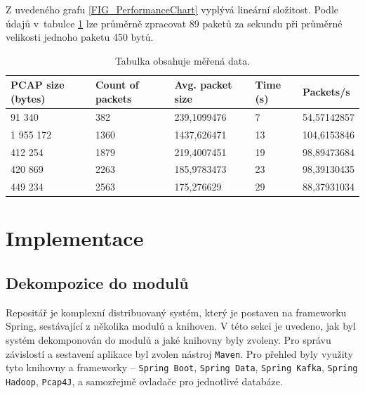 \vspace{0.5cm}

\noindent Z uvedeného grafu \ref{FIG_PerformanceChart} vyplývá lineární složitost. Podle údajů v~tabulce \ref{TablePerformance} lze průměrně zpracovat 89 paketů za sekundu při průměrné velikosti jednoho paketu 450 bytů.



\vspace{0.5cm}

\begin{table}[h!]
    \centering
    \begin{tabular}{| l | l | l | l | l |}
    \hline
    PCAP size (bytes)   &   Count of packets   &   Avg. packet size &  Time (s) &   Packets/s \\ \hline
    91 340 & 382 & 239,1099476 & 7 & 54,57142857 \\ \hline
    1 955 172 & 1360 & 1437,626471 & 13 & 104,6153846 \\ \hline
    412 254 & 1879 & 219,4007451 & 19 & 98,89473684 \\ \hline
    420 869 & 2263 & 185,9783473 & 23 & 98,39130435 \\ \hline
    449 234 & 2563 & 175,276629 & 29 & 88,37931034 \\ \hline
    \end{tabular}\par
    \bigskip
    \caption{Tabulka obsahuje měřená data.}
    \label{TablePerformance}
\end{table}

\chapter{Implementace} \label{chapter_impl}

\section{Dekompozice do modulů}
Repositář je komplexní distribuovaný systém, který je postaven na frameworku Spring, sestávající z několika modulů a knihoven. V této sekci je uvedeno, jak byl systém dekomponován do modulů a jaké knihovny byly zvoleny. Pro správu závislostí a sestavení aplikace byl zvolen nástroj \texttt{Maven}. Pro přehled byly využity tyto knihovny a frameworky -- \texttt{Spring Boot}, \texttt{Spring Data}, \texttt{Spring Kafka}, \texttt{Spring Hadoop}, \texttt{Pcap4J}, a samozřejmě ovladače pro jednotlivé databáze.

